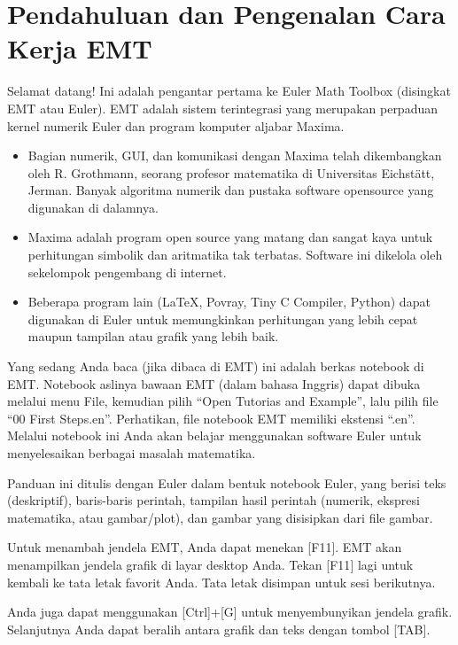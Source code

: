 \documentclass[
]{book}
\author{}
\date{}
\providecommand{\tightlist}{%
  \setlength{\itemsep}{0pt}\setlength{\parskip}{0pt}}
\begin{document}
\frontmatter

\mainmatter
\chapter{Pendahuluan dan Pengenalan Cara Kerja EMT}\label{pendahuluan-dan-pengenalan-cara-kerja-emt}

Selamat datang! Ini adalah pengantar pertama ke Euler Math Toolbox (disingkat EMT atau Euler). EMT adalah sistem terintegrasi yang merupakan perpaduan kernel numerik Euler dan program komputer aljabar Maxima.

\begin{itemize}
\tightlist
\item
  Bagian numerik, GUI, dan komunikasi dengan Maxima telah dikembangkan oleh R. Grothmann, seorang profesor matematika di Universitas Eichstätt, Jerman. Banyak algoritma numerik dan pustaka software opensource yang digunakan di dalamnya.
\item
  Maxima adalah program open source yang matang dan sangat kaya untuk perhitungan simbolik dan aritmatika tak terbatas. Software ini dikelola oleh sekelompok pengembang di internet.
\item
  Beberapa program lain (LaTeX, Povray, Tiny C Compiler, Python) dapat digunakan di Euler untuk memungkinkan perhitungan yang lebih cepat maupun tampilan atau grafik yang lebih baik.
\end{itemize}

Yang sedang Anda baca (jika dibaca di EMT) ini adalah berkas notebook di EMT. Notebook aslinya bawaan EMT (dalam bahasa Inggris) dapat dibuka melalui menu File, kemudian pilih ``Open Tutorias and Example'', lalu pilih file ``00 First Steps.en''. Perhatikan, file notebook EMT memiliki ekstensi ``.en''. Melalui notebook ini Anda akan belajar menggunakan software Euler untuk menyelesaikan berbagai masalah matematika.

Panduan ini ditulis dengan Euler dalam bentuk notebook Euler, yang berisi teks (deskriptif), baris-baris perintah, tampilan hasil perintah (numerik, ekspresi matematika, atau gambar/plot), dan gambar yang disisipkan dari file gambar.

Untuk menambah jendela EMT, Anda dapat menekan {[}F11{]}. EMT akan menampilkan jendela grafik di layar desktop Anda. Tekan {[}F11{]} lagi untuk kembali ke tata letak favorit Anda. Tata letak disimpan untuk sesi berikutnya.

Anda juga dapat menggunakan {[}Ctrl{]}+{[}G{]} untuk menyembunyikan jendela grafik. Selanjutnya Anda dapat beralih antara grafik dan teks dengan tombol {[}TAB{]}.
\end{document}
